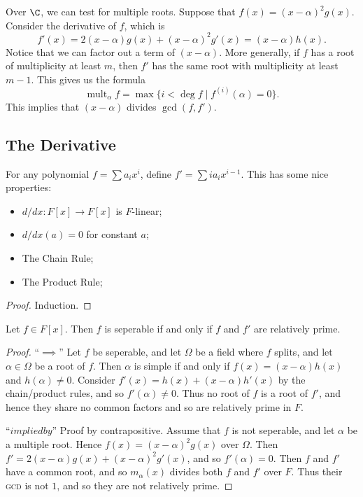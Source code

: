 Over $\C$, we can test for multiple roots. Suppose that $f(x) = (x-\alpha)^2g(x)$. Consider the derivative of $f$, which is 
\[ f'(x) = 2(x-\alpha)g(x) + (x-\alpha)^2g'(x) = (x-\alpha)h(x). \]
Notice that we can factor out a term of $(x-\alpha)$. More generally, if $f$ has a root of multiplicity at least $m$, then $f'$ has the same root with multiplicity at least $m-1$. This gives us the formula
\[ \operatorname{mult}_\alpha f = \max\{i < \deg f \mid f^{(i)}(\alpha) = 0\}. \]
This implies that $(x-\alpha)$ divides $\gcd(f,f')$.

\subsection{The Derivative}

For any polynomial $f = \sum a_ix^i$, define $f' = \sum ia_ix^{i-1}$. This has some nice properties:
\begin{itemize}
\item $d/dx\colon F[x] \to F[x]$ is $F$-linear;
\item $d/dx(a) = 0$ for constant $a$;
\item The Chain Rule;
\item The Product Rule;
\end{itemize}

\begin{proof}
Induction.
\end{proof}

\begin{proposition}
Let $f \in F[x]$. Then $f$ is seperable if and only if $f$ and $f'$ are relatively prime.
\end{proposition}

\begin{proof}
``$\implies$'' Let $f$ be seperable, and let $\Omega$ be a field where $f$ splits, and let $\alpha \in \Omega$ be a root of $f$. Then $\alpha$ is simple if and only if $f(x) = (x-\alpha)h(x)$ and $h(\alpha) \not= 0$. Consider $f'(x) = h(x) + (x-\alpha)h'(x)$ by the chain/product rules, and so $f'(\alpha) \not= 0$. Thus no root of $f$ is a root of $f'$, and hence they share no common factors and so are relatively prime in $F$.

``$impliedby$'' Proof by contrapositive. Assume that $f$ is not seperable, and let $\alpha$ be a multiple root. Hence $f(x) = (x-\alpha)^2g(x)$ over $\Omega$. Then $f' = 2(x-\alpha)g(x) + (x-\alpha)^2g'(x)$, and so $f'(\alpha) = 0$. Then $f$ and $f'$ have a common root, and so $m_\alpha(x)$ divides both $f$ and $f'$ over $F$. Thus their \textsc{gcd} is not $1$, and so they are not relatively prime.
\end{proof}

